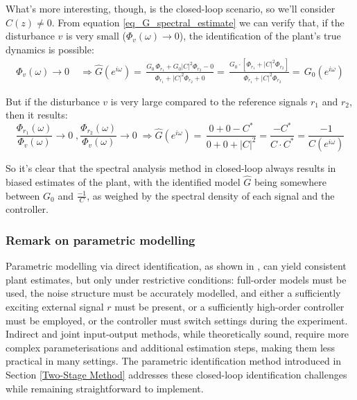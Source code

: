 \documentclass[  10pt, twoside]{report} %
\numberwithin{equation}{chapter}
\begin{document}
What's more interesting, though, is the closed-loop scenario, so we'll consider $C(z) \neq 0$. From equation \eqref{eq_G_spectral_estimate} we can verify that, if the disturbance $v$ is very small ($\Phi_{v}(\omega) \longrightarrow 0 $), the identification of the plant's true dynamics is possible:
\begin{align}
    \Phi_{v}(\omega) \longrightarrow 0  \; & \Longrightarrow \widehat{G}(e^{i\omega}) =\, \frac{G_0 \,  \Phi_{r_{1}} +  G_0 \left|C\right|^2 \Phi_{r_{2}} - 0 }{ \Phi_{r_{1}} + \left| C\right|^2 \Phi_{r_{2}} + 0 } = \, \frac{ G_0 \cdot \left[\Phi_{r_{1}} + \left|C\right|^2 \Phi_{r_{2}}\right] }{ \quad \Phi_{r_{1}} + \left| C\right|^2 \Phi_{r_{2}}} = \, G_{0}(e^{i\omega})   
\end{align}

But if the disturbance $v$ is very large compared to the reference signals $r_1$ and $r_2$, then it results:
\begin{equation}
    \frac{\Phi_{r_{1}}(\omega)}{\Phi_{v}(\omega)} \longrightarrow 0 \; , \frac{\Phi_{r_{2}}(\omega)}{\Phi_{v}(\omega)} \longrightarrow 0 \; \Longrightarrow \widehat{G}(e^{i\omega}) =\,\frac{0 +  0 - C^{*} }{ 0 + 0 + \left|C\right|^2 } = \frac{- C^{*}}{C \cdot C^{*}} = \frac{-1}{C(e^{i\omega})}
\end{equation}

So it's clear that the spectral analysis method in closed-loop always results in biased estimates of the plant, with the identified model $\widehat{G}$ being somewhere between $G_0$ and $\frac{-1}{C}$, as weighed by the spectral density of each signal and the controller.

\subsubsection{Remark on parametric modelling}
Parametric modelling via direct identification, as shown in \cite{VanDenHof2020}, can yield consistent plant estimates, but only under restrictive conditions: full-order models must be used, the noise structure must be accurately modelled, and either a sufficiently exciting external signal $r$ must be present, or a sufficiently high-order controller must be employed, or the controller must switch settings during the experiment. Indirect and joint input-output methods, while theoretically sound, require more complex parameterisations and additional estimation steps, making them less practical in many settings. The parametric identification method introduced in Section \ref{Two-Stage Method} addresses these closed-loop identification challenges while remaining straightforward to implement.
\end{document}
